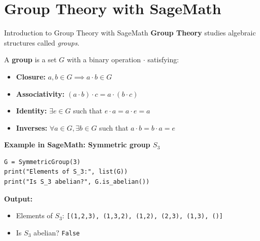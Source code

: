 \documentclass[10pt]{beamer}
\begin{document}
\section{\textbf{Group Theory with SageMath}}
\begin{frame}[fragile]{Introduction to Group Theory with SageMath}
\textbf{Group Theory} studies algebraic structures called \emph{groups}.

A \textbf{group} is a set $G$ with a binary operation $\cdot$ satisfying:
\begin{itemize}
\item \textbf{Closure:} $a, b \in G \implies a \cdot b \in G$
\item \textbf{Associativity:} $(a \cdot b) \cdot c = a \cdot (b \cdot c)$
\item \textbf{Identity:} $\exists e \in G$ such that $e \cdot a = a \cdot e = a$
\item \textbf{Inverses:} $\forall a \in G, \exists b \in G$ such that $a \cdot b = b \cdot a = e$
\end{itemize}
\textbf{Example in SageMath: Symmetric group $S_3$}
\vspace{1mm}
\begin{lstlisting}[style=mypython]
G = SymmetricGroup(3)
print("Elements of S_3:", list(G))
print("Is S_3 abelian?", G.is_abelian())
\end{lstlisting}

\vspace{-1mm}
\textbf{Output:}
\begin{itemize}
\item Elements of $S_3$: \texttt{[(1,2,3), (1,3,2), (1,2), (2,3), (1,3), ()]}
\item Is $S_3$ abelian? \texttt{False}
\end{itemize}
\end{frame}
\end{document}
